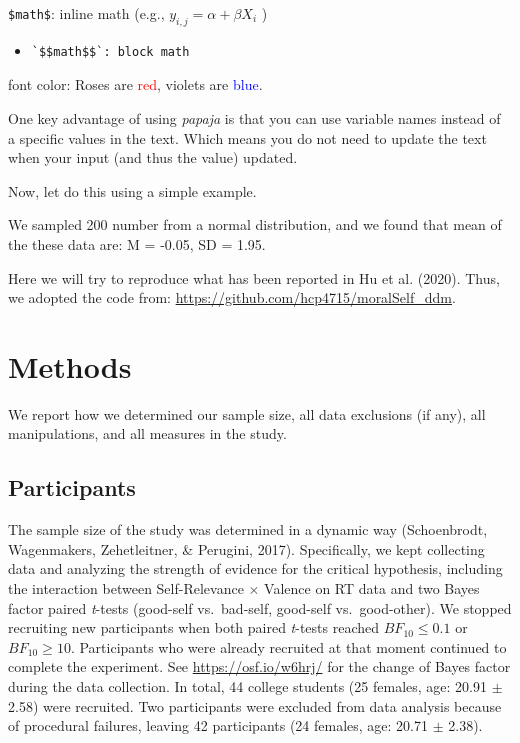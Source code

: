 \documentclass[
  man]{apa6}
\begin{document}
\texttt{\$math\$}: inline math (e.g., \(y_{i,j} = \alpha + \beta X_i\) )

\begin{itemize}
\item
\begin{verbatim}
`$$math$$`: block math
\end{verbatim}
\end{itemize}

font color: Roses are \textcolor{red}{red}, violets are \textcolor{blue}{blue}.

One key advantage of using \emph{papaja} is that you can use variable names instead of a specific values in the text. Which means you do not need to update the text when your input (and thus the value) updated.

Now, let do this using a simple example.

We sampled 200 number from a normal distribution, and we found that mean of the these data are: M = -0.05, SD = 1.95.

Here we will try to reproduce what has been reported in Hu et al. (2020). Thus, we adopted the code from: \url{https://github.com/hcp4715/moralSelf_ddm}.

\section{Methods}\label{methods}

We report how we determined our sample size, all data exclusions (if any), all manipulations, and all measures in the study.

\subsection{Participants}\label{participants}

The sample size of the study was determined in a dynamic way (Schoenbrodt, Wagenmakers, Zehetleitner, \& Perugini, 2017). Specifically, we kept collecting data and analyzing the strength of evidence for the critical hypothesis, including the interaction between Self-Relevance × Valence on RT data and two Bayes factor paired \emph{t}-tests (good-self vs.~bad-self, good-self vs.~good-other). We stopped recruiting new participants when both paired \emph{t}-tests reached \(BF_{10} \le 0.1\) or \(BF_{10} \ge 10\). Participants who were already recruited at that moment continued to complete the experiment. See \url{https://osf.io/w6hrj/} for the change of Bayes factor during the data collection. In total, 44 college students (25 females, age: 20.91 \(\pm\) 2.58) were recruited. Two participants were excluded from data analysis because of procedural failures, leaving 42 participants (24 females, age: 20.71 \(\pm\) 2.38).
\end{document}
